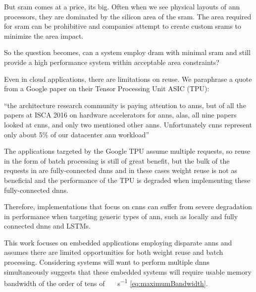 But \ac{sram} comes at a price, its big. Often when we see physical layouts of \ac{ann} processors, they are dominated by the silicon area of the \ac{sram}. The area required for \ac{sram} can be prohibitive and companies attempt to create custom \acp{sram} to minimize the area impact.

So the question becomes, can a system employ \ac{dram} with minimal \ac{sram} and still provide a high performance system within acceptable area constraints?

\iffalse
We believe a system can be designed with \ac{dram} as the primary processing store. This will require careful use of data structures to describe storage within \ac{dram} to ensure we make good use of the potential bandwidth. But there are other benefits we will take advantage of, but more about that later.
\fi

\iffalse
There important application is disparate \ac{ann}s because specifically a form of \ac{dnn}, Convolutional Neural networks (\ac{cnn}) have gotten good press recently, but they are not the only \ac{dnn}.
\fi

Even in cloud applications, there are limitations on reuse. We paraphrase a quote from a Google paper \cite{jouppi2017datacenter} on their Tensor Processing Unit ASIC (TPU):

\hyphenquote{american}{the architecture research community is paying attention to \acp{ann}, but of all the papers at ISCA 2016 on hardware accelerators for \acp{ann}, alas, all nine papers looked at \ac{cnn}s, and only two mentioned other \acp{ann}. Unfortunately \ac{cnn}s represent only about 5\% of our datacenter \ac{ann} workload}

The applications targeted by the Google TPU \cite{jouppi2017datacenter} assume multiple requests, so reuse in the form of batch processing is still of great benefit, but the bulk of the requests in \cite{jouppi2017datacenter} are fully-connected \ac{dnn}s and in these cases weight reuse is not as beneficial and the performance of the TPU is degraded when implementing these fully-connected \ac{dnn}s.

Therefore, implementations that focus on \ac{cnn}s can suffer from severe degradation in performance when targeting generic types of \ac{ann}, such as locally and fully connected \ac{dnn}s and LSTMs.

This work focuses on embedded applications employing disparate \ac{ann}s and assumes there are limited opportunities for both weight reuse and batch processing.
Considering systems will want to perform multiple \ac{dnn}s simultaneously suggests that these embedded systems will require usable memory bandwidth of the order of tens of \SI[per-mode=symbol]{}{\tera \bit \per \second} \eqref{eq:maximumBandwidth}.

